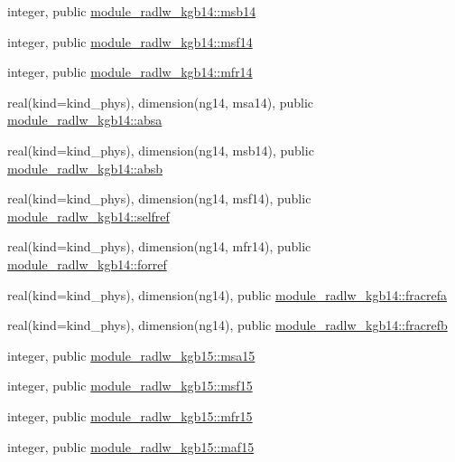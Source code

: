 \begin{DoxyCompactItemize}
\item 
integer, public \hyperlink{namespacemodule__radlw__kgb14_a2d400a2aa969f2b2b6efd15555b67159}{module\+\_\+radlw\+\_\+kgb14\+::msb14}
\item 
integer, public \hyperlink{namespacemodule__radlw__kgb14_a37c15d52e45cd6b36dc246a059b0c5ca}{module\+\_\+radlw\+\_\+kgb14\+::msf14}
\item 
integer, public \hyperlink{namespacemodule__radlw__kgb14_a52354badbce95c005b19bd5a443fd488}{module\+\_\+radlw\+\_\+kgb14\+::mfr14}
\item 
real(kind=kind\+\_\+phys), dimension(ng14, msa14), public \hyperlink{namespacemodule__radlw__kgb14_ab57cb029ede27280bc99641f39ab3a81}{module\+\_\+radlw\+\_\+kgb14\+::absa}
\item 
real(kind=kind\+\_\+phys), dimension(ng14, msb14), public \hyperlink{namespacemodule__radlw__kgb14_aa7a122319c49f3c1e8d51d21771cb63d}{module\+\_\+radlw\+\_\+kgb14\+::absb}
\item 
real(kind=kind\+\_\+phys), dimension(ng14, msf14), public \hyperlink{namespacemodule__radlw__kgb14_a0e390a41b1c9e2ece765d65774060bca}{module\+\_\+radlw\+\_\+kgb14\+::selfref}
\item 
real(kind=kind\+\_\+phys), dimension(ng14, mfr14), public \hyperlink{namespacemodule__radlw__kgb14_a8478067cb8a07a02b56c09fa3c73eb67}{module\+\_\+radlw\+\_\+kgb14\+::forref}
\item 
real(kind=kind\+\_\+phys), dimension(ng14), public \hyperlink{namespacemodule__radlw__kgb14_ae1e7065b9ea30b36a3665ad594545e9b}{module\+\_\+radlw\+\_\+kgb14\+::fracrefa}
\item 
real(kind=kind\+\_\+phys), dimension(ng14), public \hyperlink{namespacemodule__radlw__kgb14_a13a211bf8a903d0720fa72ac90e4fc3f}{module\+\_\+radlw\+\_\+kgb14\+::fracrefb}
\item 
integer, public \hyperlink{namespacemodule__radlw__kgb15_abb9e98034166a07a6e349631d7fbb2a3}{module\+\_\+radlw\+\_\+kgb15\+::msa15}
\item 
integer, public \hyperlink{namespacemodule__radlw__kgb15_ae1b588ee60974c2d451c89f842601e07}{module\+\_\+radlw\+\_\+kgb15\+::msf15}
\item 
integer, public \hyperlink{namespacemodule__radlw__kgb15_ad4d78009d0c7ffa27dbb228e68307675}{module\+\_\+radlw\+\_\+kgb15\+::mfr15}
\item 
integer, public \hyperlink{namespacemodule__radlw__kgb15_a482858cf08fb1a14117dfbaa6a57fe8c}{module\+\_\+radlw\+\_\+kgb15\+::maf15}
\item 

\end{DoxyCompactItemize}
